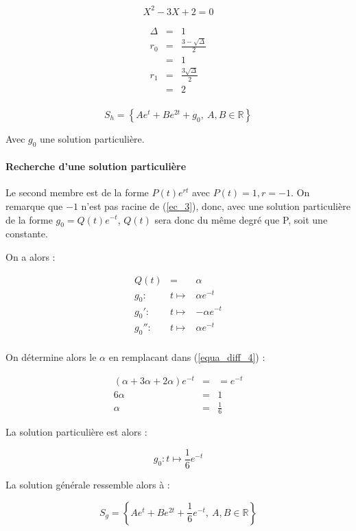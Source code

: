 \documentclass[a4paper, 11pt]{report} %
\newcommand{\R}{\mathbb{R}}
\renewcommand{\mapsto}{\longmapsto}
\begin{document}
\begin{equation}
X^2  -3X + 2 = 0
\label{ec_3}
\end{equation}

\begin{eqnarray*}
    \Delta & = & 1\\
    r_0 & = & \frac{3-\sqrt{\Delta}}{2}\\
    & = & 1\\
    r_1 & = & \frac{3\sqrt{\Delta}}{2}\\
    & = & 2\\
\end{eqnarray*}

\[
S_h = \left\{Ae^{t} + Be^{2t} + g_0,~A,B\in\R\right\}
\]

Avec $g_0$ une solution particulière.

\paragraph{Recherche d'une solution particulière}

Le second membre est de la forme $P(t)e^{rt}$ avec $P(t)=1, r = -1$. On remarque que $-1$ n'est pas racine de
(\ref{ec_3}), donc, avec une solution particulière de la forme $g_0=Q(t)e^{-t}$, $Q(t)$ sera donc du même degré que P,
soit une constante.

On a alors :

\begin{eqnarray*}
Q(t) & = & \alpha\\
g_0 : & t \mapsto & \alpha e^{-t}\\
g_0' : & t \mapsto & -\alpha e^{-t}\\
g_0'' : & t \mapsto & \alpha e^{-t}\\
\end{eqnarray*}

On détermine alors le $\alpha$ en remplacant dans (\ref{equa_diff_4}) :

\begin{eqnarray*}
(\alpha +3\alpha+2\alpha)e^{-t} & = &= e^{-t}\\
6\alpha & = & 1\\
\alpha & = & \frac{1}{6}
\end{eqnarray*}

La solution particulière est alors :

\[g_0 : t \mapsto \frac{1}{6}e^{-t}\]

La solution générale ressemble alors à :

\[
S_g = \left\{Ae^{t} + Be^{2t} + \frac{1}{6}e^{-t},~A,B\in\R\right\}
\]
\end{document}

